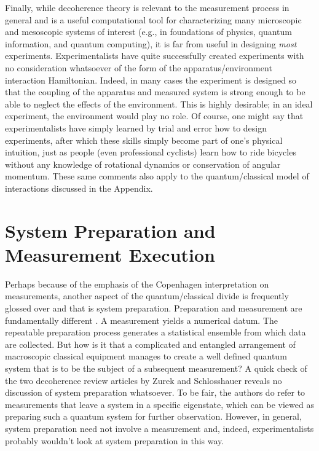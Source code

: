 \documentclass [12pt]{revtex4}
\begin{document}
Finally, while decoherence theory is relevant to
the measurement process in general and is a useful
computational tool for characterizing many microscopic and
mesoscopic systems of interest (e.g., in foundations of physics,
quantum information, and quantum
computing), it is far from useful in designing {\it most} experiments.
Experimentalists have quite successfully created experiments with no
consideration whatsoever of the form of the apparatus/environment
interaction Hamiltonian. Indeed, in many cases the experiment is
designed so that the coupling of the apparatus and measured system
is strong enough to be able to {neglect} the effects of the
environment. This is highly desirable; in an ideal experiment, the
environment would play no role. Of course, one might say that
experimentalists have simply {learned} by trial and error how to
design experiments, after which these skills simply become part of
one's physical intuition, just as people (even professional
cyclists) learn how to ride bicycles without any knowledge of
rotational dynamics or conservation of angular momentum. These same
comments also apply to the quantum/classical model of interactions
discussed in the Appendix.


\section{System Preparation and Measurement Execution}\label{SPME}

Perhaps because of the emphasis of the Copenhagen interpretation on
measurements, another aspect of the quantum/classical divide is
frequently glossed over and that is {system preparation}.
Preparation and measurement are fundamentally different
\cite{PB1992}. A measurement yields a numerical datum. The repeatable
preparation process generates a statistical ensemble from which data are
collected. But how is it that a complicated and entangled arrangement
of macroscopic classical equipment manages to create a well defined
quantum system that is to be the subject of a subsequent
measurement? A quick check of the two decoherence review articles by
Zurek \cite{Z2003} and Schlosshauer \cite{S2004} reveals no discussion of system
preparation whatsoever. To be fair, the authors do refer to
measurements that leave a system in a specific eigenstate, which can
be viewed as preparing such a quantum system for further
observation. However, in general, system preparation need not
involve a measurement \cite{PB1992} and, indeed, experimentalists probably
wouldn't look at system preparation in this way.
\end{document}
